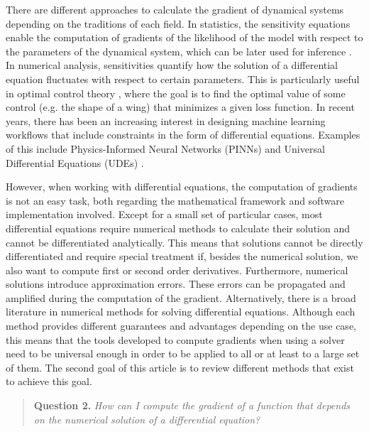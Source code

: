 There are different approaches to calculate the gradient of dynamical systems depending on the traditions of each field. 
In statistics, the sensitivity equations enable the computation of gradients of the likelihood of the model with respect to the parameters of the dynamical system, which can be later used for inference \cite{ramsay2017dynamic}. 
In numerical analysis, sensitivities quantify how the solution of a differential equation fluctuates with respect to certain parameters. 
This is particularly useful in optimal control theory \cite{Giles_Pierce_2000}, where the goal is to find the optimal value of some control (e.g. the shape of a wing) that minimizes a given loss function. 
In recent years, there has been an increasing interest in designing machine learning workflows that include constraints in the form of differential equations. 
Examples of this include Physics-Informed Neural Networks (PINNs) \cite{PINNs_2019} and Universal Differential Equations (UDEs) \cite{rackauckas2020universal}.  


However, when working with differential equations, the computation of gradients is not an easy task, both regarding the mathematical framework and software implementation involved. 
Except for a small set of particular cases, most differential equations require numerical methods to calculate their solution and cannot be differentiated analytically. 
This means that solutions cannot be directly differentiated and require special treatment if, besides the numerical solution, we also want to compute first or second order derivatives. 
Furthermore, numerical solutions introduce approximation errors. 
These errors can be propagated and amplified during the computation of the gradient. 
Alternatively, there is a broad literature in numerical methods for solving differential equations. 
Although each method provides different guarantees and advantages depending on the use case, this means that the tools developed to compute gradients when using a solver need to be universal enough in order to be applied to all or 
at least to a large set of them. 
The second goal of this article is to review different methods that exist to achieve this goal.
\begin{quote}
    \textbf{Question 2. }
    \textit{How can I compute the gradient of a function that depends on the numerical solution of a differential equation?}
\end{quote}

